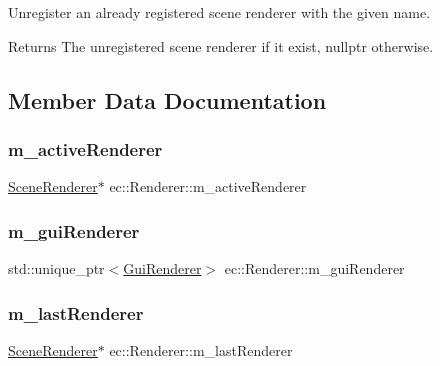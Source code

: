 Unregister an already registered scene renderer with the given name. \begin{DoxyReturn}{Returns}
The unregistered scene renderer if it exist, nullptr otherwise. 
\end{DoxyReturn}


\subsection{Member Data Documentation}
\mbox{\label{classec_1_1_renderer_a00afed952025d62a654a5f961a55b342}} 
\subsubsection{\texorpdfstring{m\+\_\+active\+Renderer}{m\_activeRenderer}}
{\footnotesize\ttfamily \mbox{\hyperlink{classec_1_1_scene_renderer}{Scene\+Renderer}}$\ast$ ec\+::\+Renderer\+::m\+\_\+active\+Renderer\hspace{0.3cm}{\ttfamily [protected]}}

\mbox{\label{classec_1_1_renderer_ac5969cd9baf68b5a3a02535bc9e9dd07}} 
\subsubsection{\texorpdfstring{m\+\_\+gui\+Renderer}{m\_guiRenderer}}
{\footnotesize\ttfamily std\+::unique\+\_\+ptr$<$\mbox{\hyperlink{classec_1_1_gui_renderer}{Gui\+Renderer}}$>$ ec\+::\+Renderer\+::m\+\_\+gui\+Renderer\hspace{0.3cm}{\ttfamily [protected]}}

\mbox{\label{classec_1_1_renderer_a818d84064fde8088d28358f7ea04f898}} 
\subsubsection{\texorpdfstring{m\+\_\+last\+Renderer}{m\_lastRenderer}}
{\footnotesize\ttfamily \mbox{\hyperlink{classec_1_1_scene_renderer}{Scene\+Renderer}}$\ast$ ec\+::\+Renderer\+::m\+\_\+last\+Renderer\hspace{0.3cm}{\ttfamily [protected]}}

